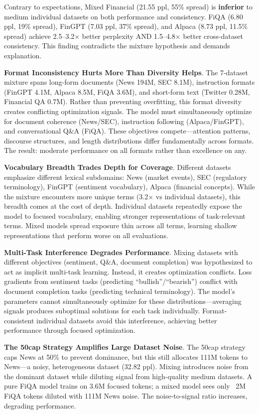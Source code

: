 Contrary to expectations, Mixed Financial (21.55 ppl, 55\% spread) is \textbf{inferior} to medium individual datasets on both performance and consistency. FiQA (6.80 ppl, 19\% spread), FinGPT (7.03 ppl, 37\% spread), and Alpaca (8.73 ppl, 11.5\% spread) achieve 2.5–3.2$\times$ better perplexity AND 1.5–4.8$\times$ better cross-dataset consistency. This finding contradicts the mixture hypothesis and demands explanation.

\textbf{Format Inconsistency Hurts More Than Diversity Helps}. The 7-dataset mixture spans long-form documents (News 194M, SEC 8.1M), instruction formats (FinGPT 4.1M, Alpaca 8.5M, FiQA 3.6M), and short-form text (Twitter 0.28M, Financial QA 0.7M). Rather than preventing overfitting, this format diversity creates conflicting optimization signals. The model must simultaneously optimize for document coherence (News/SEC), instruction following (Alpaca/FinGPT), and conversational Q\&A (FiQA). These objectives compete—attention patterns, discourse structures, and length distributions differ fundamentally across formats. The result: moderate performance on all formats rather than excellence on any.

\textbf{Vocabulary Breadth Trades Depth for Coverage}. Different datasets emphasize different lexical subdomains: News (market events), SEC (regulatory terminology), FinGPT (sentiment vocabulary), Alpaca (financial concepts). While the mixture encounters more unique terms (3.2$\times$ vs individual datasets), this breadth comes at the cost of depth. Individual datasets repeatedly expose the model to focused vocabulary, enabling stronger representations of task-relevant terms. Mixed models spread exposure thin across all terms, learning shallow representations that perform worse on all evaluations.

\textbf{Multi-Task Interference Degrades Performance}. Mixing datasets with different objectives (sentiment, Q\&A, document completion) was hypothesized to act as implicit multi-task learning. Instead, it creates optimization conflicts. Loss gradients from sentiment tasks (predicting ``bullish''/``bearish'') conflict with document completion tasks (predicting technical terminology). The model's parameters cannot simultaneously optimize for these distributions—averaging signals produces suboptimal solutions for each task individually. Format-consistent individual datasets avoid this interference, achieving better performance through focused optimization.

\textbf{The 50cap Strategy Amplifies Large Dataset Noise}. The 50cap strategy caps News at 50\% to prevent dominance, but this still allocates 111M tokens to News—a noisy, heterogeneous dataset (32.82 ppl). Mixing introduces noise from the dominant dataset while diluting signal from high-quality medium datasets. A pure FiQA model trains on 3.6M focused tokens; a mixed model sees only ~2M FiQA tokens diluted with 111M News noise. The noise-to-signal ratio increases, degrading performance.

